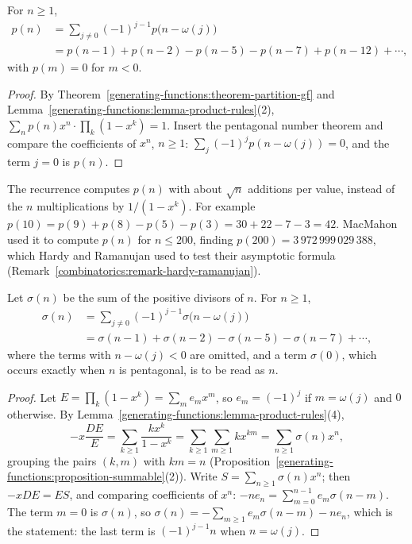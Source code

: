 \begin{corollary}\label{generating-functions:corollary-partition-recurrence}
For $n \geq 1$,
\[
\begin{aligned}
p(n) &= \sum_{j \neq 0}(-1)^{j-1}p\bigl(n - \omega(j)\bigr)\\
&= p(n - 1) + p(n - 2) - p(n - 5) - p(n - 7) + p(n - 12) + \cdots,
\end{aligned}
\]
with $p(m) = 0$ for $m < 0$.
\end{corollary}

\begin{proof}
By Theorem~\ref{generating-functions:theorem-partition-gf} and Lemma~\ref{generating-functions:lemma-product-rules}(2), $\sum_np(n)x^n \cdot \prod_k(1 - x^k) = 1$. Insert the pentagonal number
theorem and compare the coefficients of $x^n$, $n \geq 1$: $\sum_j(-1)^jp(n - \omega(j)) = 0$, and the term $j = 0$ is $p(n)$.
\end{proof}

The recurrence computes $p(n)$ with about $\sqrt n$ additions per value, instead of the $n$ multiplications by $1/(1 - x^k)$. For example $p(10) = p(9) + p(8) - p(5) - p(3) = 30 + 22 - 7 - 3 = 42$.
MacMahon used it to compute $p(n)$ for $n \leq 200$, finding $p(200) = 3\,972\,999\,029\,388$, which Hardy and Ramanujan used to test their asymptotic formula
(Remark~\ref{combinatorics:remark-hardy-ramanujan}).

\begin{corollary}\label{generating-functions:corollary-sigma-recurrence}
Let $\sigma(n)$ be the sum of the positive divisors of $n$. For $n \geq 1$,
\[
\begin{aligned}
\sigma(n) &= \sum_{j \neq 0}(-1)^{j-1}\sigma\bigl(n - \omega(j)\bigr)\\
&= \sigma(n - 1) + \sigma(n - 2) - \sigma(n - 5) - \sigma(n - 7) + \cdots,
\end{aligned}
\]
where the terms with $n - \omega(j) < 0$ are omitted, and a term $\sigma(0)$, which occurs exactly when $n$ is pentagonal, is to be read as $n$.
\end{corollary}

\begin{proof}
Let $E = \prod_k(1 - x^k) = \sum_me_mx^m$, so $e_m = (-1)^j$ if $m = \omega(j)$ and $0$ otherwise. By Lemma~\ref{generating-functions:lemma-product-rules}(4),
\[
-x\frac{DE}{E} = \sum_{k \geq 1}\frac{kx^k}{1 - x^k} = \sum_{k \geq 1}\sum_{m \geq 1}kx^{km} = \sum_{n \geq 1}\sigma(n)x^n,
\]
grouping the pairs $(k, m)$ with $km = n$ (Proposition~\ref{generating-functions:proposition-summable}(2)). Write $S = \sum_{n \geq 1}\sigma(n)x^n$; then $-xDE = ES$, and comparing coefficients of
$x^n$: $-ne_n = \sum_{m=0}^{n-1}e_m\sigma(n - m)$. The term $m = 0$ is $\sigma(n)$, so $\sigma(n) = -\sum_{m \geq 1}e_m\sigma(n - m) - ne_n$, which is the statement: the last term is $(-1)^{j-1}n$ when
$n = \omega(j)$.
\end{proof}

